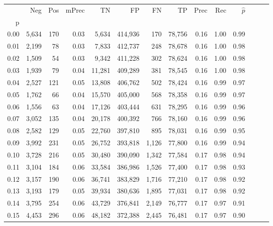 \begin{tabular}{rrrrrrrrrrrrrr}
\toprule
{} &    Neg &    Pos & mPrec &       TN &       FP &      FN &      TP &  Prec &   Rec & $\hat{p}$ \\
p    &        &        &       &          &          &         &         &       &       &           \\
\midrule
0.00 &  5,634 &    170 &  0.03 &    5,634 &  414,936 &     170 &  78,756 &  0.16 &  1.00 &      0.99 \\
0.01 &  2,199 &     78 &  0.03 &    7,833 &  412,737 &     248 &  78,678 &  0.16 &  1.00 &      0.98 \\
0.02 &  1,509 &     54 &  0.03 &    9,342 &  411,228 &     302 &  78,624 &  0.16 &  1.00 &      0.98 \\
0.03 &  1,939 &     79 &  0.04 &   11,281 &  409,289 &     381 &  78,545 &  0.16 &  1.00 &      0.98 \\
0.04 &  2,527 &    121 &  0.05 &   13,808 &  406,762 &     502 &  78,424 &  0.16 &  0.99 &      0.97 \\
0.05 &  1,762 &     66 &  0.04 &   15,570 &  405,000 &     568 &  78,358 &  0.16 &  0.99 &      0.97 \\
0.06 &  1,556 &     63 &  0.04 &   17,126 &  403,444 &     631 &  78,295 &  0.16 &  0.99 &      0.96 \\
0.07 &  3,052 &    135 &  0.04 &   20,178 &  400,392 &     766 &  78,160 &  0.16 &  0.99 &      0.96 \\
0.08 &  2,582 &    129 &  0.05 &   22,760 &  397,810 &     895 &  78,031 &  0.16 &  0.99 &      0.95 \\
0.09 &  3,992 &    231 &  0.05 &   26,752 &  393,818 &   1,126 &  77,800 &  0.16 &  0.99 &      0.94 \\
0.10 &  3,728 &    216 &  0.05 &   30,480 &  390,090 &   1,342 &  77,584 &  0.17 &  0.98 &      0.94 \\
0.11 &  3,104 &    184 &  0.06 &   33,584 &  386,986 &   1,526 &  77,400 &  0.17 &  0.98 &      0.93 \\
0.12 &  3,157 &    190 &  0.06 &   36,741 &  383,829 &   1,716 &  77,210 &  0.17 &  0.98 &      0.92 \\
0.13 &  3,193 &    179 &  0.05 &   39,934 &  380,636 &   1,895 &  77,031 &  0.17 &  0.98 &      0.92 \\
0.14 &  3,795 &    254 &  0.06 &   43,729 &  376,841 &   2,149 &  76,777 &  0.17 &  0.97 &      0.91 \\
0.15 &  4,453 &    296 &  0.06 &   48,182 &  372,388 &   2,445 &  76,481 &  0.17 &  0.97 &      0.90 \\

\end{tabular}
